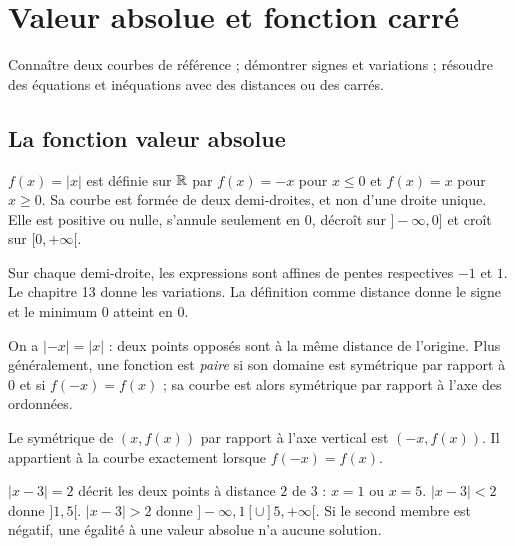 \documentclass[../cours_2de.tex]{subfiles}
\begin{document}
\setcounter{chapter}{13}
\chapter{Valeur absolue et fonction carré}
\label{sec:ch14}
\begin{objectif}
Connaître deux courbes de référence ; démontrer signes et variations ; résoudre des équations et inéquations avec des distances ou des carrés.
\end{objectif}
\section{La fonction valeur absolue}
$f(x)=|x|$ est définie sur $\mathbb{R}$ par $f(x)=-x$ pour $x\leq0$ et $f(x)=x$ pour $x\geq0$.
Sa courbe est formée de deux demi-droites, et non d'une droite unique.
Elle est positive ou nulle, s'annule seulement en $0$, décroît sur $]-\infty,0]$ et croît sur $[0,+\infty[$.
\begin{demonstration}
Sur chaque demi-droite, les expressions sont affines de pentes respectives $-1$ et $1$. Le chapitre 13 donne les variations. La définition comme distance donne le signe et le minimum $0$ atteint en $0$.
\end{demonstration}
On a $|-x|=|x|$ : deux points opposés sont à la même distance de l'origine.
Plus généralement, une fonction est \emph{paire} si son domaine est symétrique par rapport à $0$ et si $f(-x)=f(x)$ ; sa courbe est alors symétrique par rapport à l'axe des ordonnées.
\begin{demonstration}
Le symétrique de $(x,f(x))$ par rapport à l'axe vertical est $(-x,f(x))$.
Il appartient à la courbe exactement lorsque $f(-x)=f(x)$.
\end{demonstration}
\begin{exemple}
$|x-3|=2$ décrit les deux points à distance $2$ de $3$ : $x=1$ ou $x=5$.
$|x-3|<2$ donne $]1,5[$.
$|x-3|>2$ donne $]-\infty,1[\cup]5,+\infty[$.
Si le second membre est négatif, une égalité à une valeur absolue n'a aucune solution.
\end{exemple}
\end{document}

